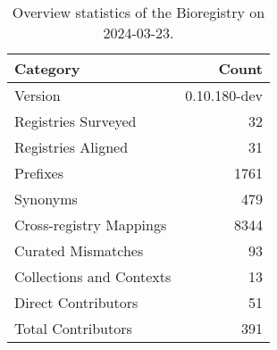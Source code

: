 \begin{table}
\caption{Overview statistics of the Bioregistry on 2024-03-23.}
\label{tab:bioregistry-summary}
\begin{tabular}{lr}
\toprule
Category & Count \\
\midrule
Version & 0.10.180-dev \\
Registries Surveyed & 32 \\
Registries Aligned & 31 \\
Prefixes & 1761 \\
Synonyms & 479 \\
Cross-registry Mappings & 8344 \\
Curated Mismatches & 93 \\
Collections and Contexts & 13 \\
Direct Contributors & 51 \\
Total Contributors & 391 \\
\bottomrule
\end{tabular}
\end{table}
